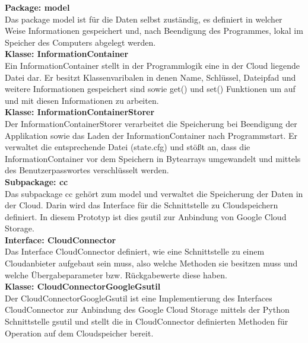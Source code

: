 \documentclass[12pt,a4paper,bibliography=totocnumbered,listof=totocnumbered]{scrartcl}
\begin{document}
\textbf{Package: model}\\
Das package model ist für die Daten selbst zuständig, es definiert in welcher Weise Informationen gespeichert und, nach Beendigung des Programmes, lokal im Speicher des Computers abgelegt werden.\\
\textbf{Klasse: InformationContainer}\\
Ein InformationContainer stellt in der Programmlogik eine in der Cloud liegende Datei dar. Er besitzt Klassenvaribalen in denen Name, Schlüssel, Dateipfad und weitere Informationen gespeichert sind sowie get() und set() Funktionen um auf und mit diesen Informationen zu arbeiten.\\
\textbf{Klasse: InformationContainerStorer}\\
Der InformationContainerStorer verarbeitet die Speicherung bei Beendigung der Applikation sowie das Laden der InformationContainer nach Programmstart. Er verwaltet die entsprechende Datei (state.cfg) und stößt an, dass die  InformationContainer vor dem Speichern in Bytearrays umgewandelt und mittels des Benutzerpasswortes verschlüsselt werden.\\
\textbf{Subpackage: cc}\\
Das subpackage cc gehört zum model und verwaltet die Speicherung der Daten in der Cloud. Darin wird das Interface für die Schnittstelle zu Cloudspeichern definiert. In diesem Prototyp ist dies gsutil zur Anbindung von Google Cloud Storage.\\
\textbf{Interface: CloudConnector}\\
Das Interface CloudConnector definiert, wie eine Schnittstelle zu einem Cloudanbieter aufgebaut sein muss, also welche Methoden sie besitzen muss und welche Übergabeparameter bzw. Rückgabewerte diese haben.\\
\textbf{Klasse: CloudConnectorGoogleGsutil}\\
Der CloudConnectorGoogleGsutil ist eine Implementierung des Interfaces CloudConnector zur Anbindung des Google Cloud Storage mittels der Python Schnittstelle gsutil und stellt die in CloudConnector definierten Methoden für Operation auf dem Cloudspeicher bereit.\\
\end{document}

